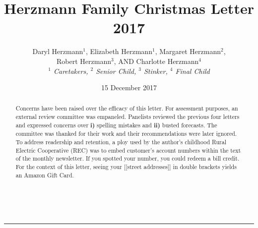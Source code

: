 \documentclass[letterpaper,11pt]{article}
\title{\vspace{-2.0cm}Herzmann Family Christmas Letter 2017}
\author{Daryl Herzmann${}^1$, Elizabeth Herzmann${}^1$, Margaret 
Herzmann${}^2$,\\
Robert Herzmann${}^3$, AND Charlotte Herzmann${}^4$ \\
\it{${}^1$ Caretakers},
\it{${}^2$ Senior Child},
\it{${}^3$ Stinker},
\it{${}^4$ Final Child}}
\date{15 December 2017}
\newcommand{\Line}[0]{%
  \rule{0cm}{0cm}\\\hrule\rule{0cm}{0cm}%
}
\begin{document}
\maketitle
\vspace{-0.75cm}
\begin{abstract}
Concerns have been raised over the efficacy of this letter. For assessment
purposes, an external review committee was empaneled.  Panelists reviewed the
previous four letters and expressed concerns over \textbf{i)} spelling mistakes
and \textbf{ii)} busted forecasts.  The committee was thanked for their work and
their recommendations were later ignored.  To address readership and retention,
a ploy used by the author's childhood Rural Electric Cooperative (REC) was to
embed customer's account numbers within the text of the monthly newsletter.  If
you spotted your number, you could redeem a bill credit.  For the context of this
letter, seeing your [[street addresses]] in double brackets yields an Amazon
Gift Card.
\end{abstract}

\vspace{-0.5cm}
\Line
\end{document}

